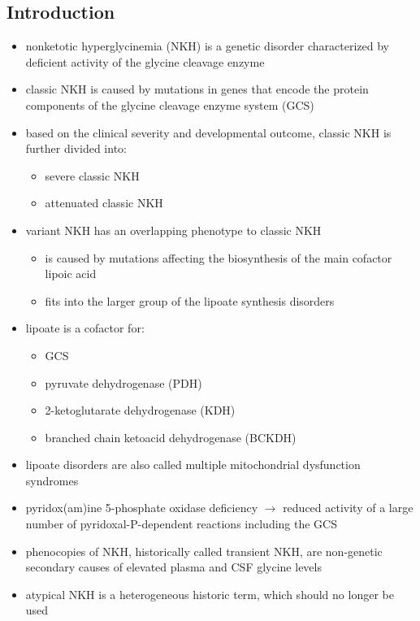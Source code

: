 \documentclass{scrartcl}
\begin{document}
\subsection{Introduction}
\label{sec:org92229ae}
\begin{itemize}
\item nonketotic hyperglycinemia (NKH) is a genetic disorder characterized
by deficient activity of the glycine cleavage enzyme
\item classic NKH is caused by mutations in genes that encode the protein
components of the glycine cleavage enzyme system (GCS)
\item based on the clinical severity and developmental outcome, classic
NKH is further divided into:
\begin{itemize}
\item severe classic NKH
\item attenuated classic NKH
\end{itemize}
\item variant NKH has an overlapping phenotype to classic NKH
\begin{itemize}
\item is caused by mutations affecting the biosynthesis of the main
cofactor lipoic acid
\item fits into the larger group of the lipoate synthesis
disorders
\end{itemize}
\item lipoate is a cofactor for:
\begin{itemize}
\item GCS
\item pyruvate dehydrogenase (PDH)
\item 2-ketoglutarate dehydrogenase (KDH)
\item branched chain ketoacid dehydrogenase (BCKDH)
\end{itemize}
\item lipoate disorders are also called multiple mitochondrial dysfunction
syndromes
\item pyridox(am)ine 5-phosphate oxidase deficiency \(\to\) reduced activity
of a large number of pyridoxal-P-dependent reactions including the
GCS
\item phenocopies of NKH, historically called transient NKH, are
non-genetic secondary causes of elevated plasma and CSF glycine
levels
\item atypical NKH is a heterogeneous historic term, which should no
longer be used
\end{itemize}
\end{document}
